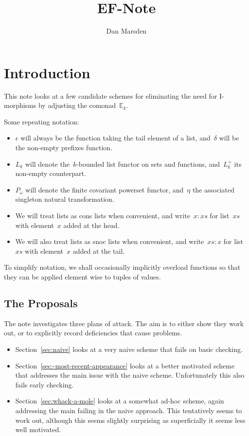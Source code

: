 \documentclass{article}
\title{EF-Note}
\author{Dan Marsden}
\theoremstyle{plain}
\theoremstyle{definition}
\theoremstyle{remark}
\numberwithin{theorem}{section}
\begin{document}
\maketitle

\section{Introduction}
This note looks at a few candidate schemes for eliminating the need for I-morphisms by adjusting the comonad~$\mathbb{E}_k$.

Some repeating notation:
\begin{itemize}
    \item $\epsilon$ will always be the function taking the tail element of a list, and~$\delta$ will be the non-empty prefixes function.
    \item $L_k$ will denote the~$k$-bounded list functor on sets and functions, and~$L^+_k$ its non-empty counterpart.
    \item $P_\omega$ will denote the finite covariant powerset functor, and~$\eta$ the associated singleton natural transformation.
    \item We will treat lists as cons lists when convenient, and write~$x:xs$ for list~$xs$ with element~$x$ added at the head.
    \item We will also treat lists as snoc lists when convenient, and write~$xs:x$ for list~$xs$ with element~$x$ added at the tail.
\end{itemize}
To simplify notation, we shall occasionally implicitly overload functions so that they can be applied element wise to tuples of values.

\subsection*{The Proposals}
The note investigates three plans of attack. The aim is to either show they work out, or to explicitly record deficiencies that cause problems.
\begin{itemize}
    \item Section~\ref{sec:naive} looks at a very naive scheme that fails on basic checking.
    \item Section~\ref{sec:-most-recent-appearance} looks at a better motivated scheme that addresses the main issue with the naive scheme. Unfortunately this also fails early checking.
    \item Section~\ref{sec:whack-a-mole} looks at a somewhat ad-hoc scheme, again addressing the main failing in the naive approach. This tentatively seems to work out, although this seems slightly surprising as superficially it seems less well motivated.
\end{itemize}
\end{document}
